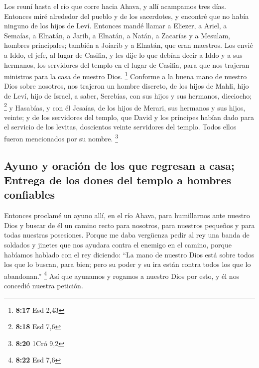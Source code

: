 \begin{paracol}{2}
 Los reuní hasta el río que corre hacia Ahava, y allí
acampamos tres días. Entonces miré alrededor del pueblo y de los
sacerdotes, y encontré que no había ninguno de los hijos de Leví.
 Entonces mandé llamar a Eliezer, a Ariel, a Semaías, a
Elnatán, a Jarib, a Elnatán, a Natán, a Zacarías y a Mesulam, hombres
principales; también a Joiarib y a Elnatán, que eran maestros.
 Los envié a Iddo, el jefe, al lugar de Casifia, y les
dije lo que debían decir a Iddo y a sus hermanos, los servidores del
templo en el lugar de Casifia, para que nos trajeran ministros para la
casa de nuestro Dios. \footnote{\textbf{8:17} Esd 2,43} 
Conforme a la buena mano de nuestro Dios sobre nosotros, nos trajeron un
hombre discreto, de los hijos de Mahli, hijo de Leví, hijo de Israel, a
saber, Serebías, con sus hijos y sus hermanos, dieciocho; \footnote{\textbf{8:18}
  Esd 7,6}  y Hasabías, y con él Jesaías, de los hijos de
Merari, sus hermanos y sus hijos, veinte;  y de los
servidores del templo, que David y los príncipes habían dado para el
servicio de los levitas, doscientos veinte servidores del templo. Todos
ellos fueron mencionados por su nombre. \footnote{\textbf{8:20} 1Cró 9,2}

\hypertarget{ayuno-y-oraciuxf3n-de-los-que-regresan-a-casa-entrega-de-los-dones-del-templo-a-hombres-confiables}{%
\subsection{Ayuno y oración de los que regresan a casa; Entrega de los
dones del templo a hombres
confiables}\label{ayuno-y-oraciuxf3n-de-los-que-regresan-a-casa-entrega-de-los-dones-del-templo-a-hombres-confiables}}

 Entonces proclamé un ayuno allí, en el río Ahava, para
humillarnos ante nuestro Dios y buscar de él un camino recto para
nosotros, para nuestros pequeños y para todas nuestras posesiones.
 Porque me daba vergüenza pedir al rey una banda de
soldados y jinetes que nos ayudara contra el enemigo en el camino,
porque habíamos hablado con el rey diciendo: ``La mano de nuestro Dios
está sobre todos los que lo buscan, para bien; pero su poder y su ira
están contra todos los que lo abandonan.'' \footnote{\textbf{8:22} Esd
  7,6}  Así que ayunamos y rogamos a nuestro Dios por
esto, y él nos concedió nuestra petición.


\end{paracol}
